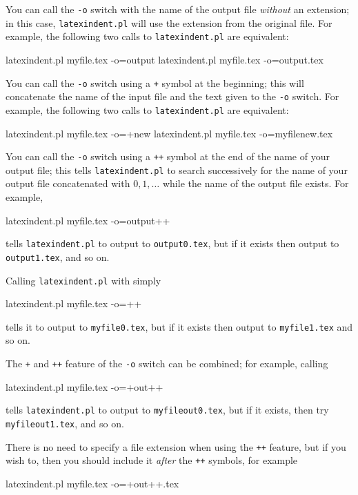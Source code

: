  You can call the \texttt{-o} switch with the name of the output file \emph{without} an
 extension; in  this case,
 \texttt{latexindent.pl} will use the extension from the original file. For example, the
 following two calls to \texttt{latexindent.pl} are equivalent:%
 \begin{commandshell}
latexindent.pl myfile.tex -o=output
latexindent.pl myfile.tex -o=output.tex
\end{commandshell}

 You can call the \texttt{-o} switch using a \texttt{+} symbol at the beginning; this will
  concatenate the name of the input file and the
 text given to the \texttt{-o} switch. For example, the following two calls to
 \texttt{latexindent.pl} are equivalent:%
 \begin{commandshell}
latexindent.pl myfile.tex -o=+new
latexindent.pl myfile.tex -o=myfilenew.tex
\end{commandshell}

 You can call the \texttt{-o} switch using a \texttt{++} symbol at the end of the name
  of your output file; this tells
 \texttt{latexindent.pl} to search successively for the name of your output file
 concatenated with $0, 1, \ldots$ while the name of the output file exists. For example,%
 \begin{commandshell}
latexindent.pl myfile.tex -o=output++
\end{commandshell}
 tells \texttt{latexindent.pl} to output to \texttt{output0.tex}, but if it exists then
 output to \texttt{output1.tex}, and so on.

 Calling \texttt{latexindent.pl} with simply
 \begin{commandshell}
latexindent.pl myfile.tex -o=++
\end{commandshell}
 tells it to output to \texttt{myfile0.tex}, but if it exists then output to
 \texttt{myfile1.tex} and so on.

 The \texttt{+} and \texttt{++} feature of the \texttt{-o} switch can be combined; for
 example, calling
 \begin{commandshell}
latexindent.pl myfile.tex -o=+out++
\end{commandshell}
 tells \texttt{latexindent.pl} to output to \texttt{myfileout0.tex}, but if it exists,
 then try \texttt{myfileout1.tex}, and so on.

 There is no need to specify a file extension when using the \texttt{++} feature, but if
 you wish to, then you should include it \emph{after} the \texttt{++} symbols, for example
 \begin{commandshell}
latexindent.pl myfile.tex -o=+out++.tex
\end{commandshell}

